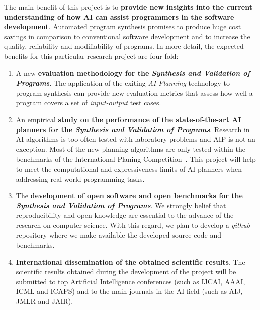\documentclass[10pt,a4paper]{paper}
\begin{document}
The main benefit of this project is to {\bf provide new insights into the current understanding of how AI can assist programmers in the software development}.  Automated program synthesis promises to produce huge cost savings in comparison to conventional software development and to increase the quality, reliability and modifiability of programs.  In more detail, the expected benefits for this particular research project are four-fold:
\begin{enumerate}
\item A new {\bf evaluation methodology for the {\em Synthesis and Validation of Programs}}. The application of the exiting {\em AI Planning} technology to program synthesis can provide new evaluation metrics that assess how well a program covers a set of {\em input-output} test cases.  
\item An empirical {\bf study on the performance of the state-of-the-art AI planners for the {\em Synthesis and Validation of Programs}}. Research in AI algorithms is too often tested with laboratory problems and AIP is not an exception. Most of the new planning algorithms are only tested within the benchmarks of the International Planing Competition~\cite{vallati:IPC:AI15}. This project will help to meet the computational and expressiveness limits of AI planners when addressing real-world programming tasks. 
\item The {\bf development of open software and open benchmarks for the {\em Synthesis and Validation of Programs}}. We strongly belief that reproducibility and open knowledge are essential to the advance of the research on computer science. With this regard, we plan to develop a {\em github} repository where we make available the developed source code and benchmarks.
\item {\bf International dissemination of the obtained scientific results}. The scientific results obtained during the development of the project will be submitted to top Artificial Intelligence conferences (such as IJCAI, AAAI, ICML and ICAPS) and to the main journals in the AI field (such as AIJ, JMLR and JAIR).
\end{enumerate}

\vspace{0.3cm}


\begin{scriptsize}

\end{scriptsize}

\end{document}
